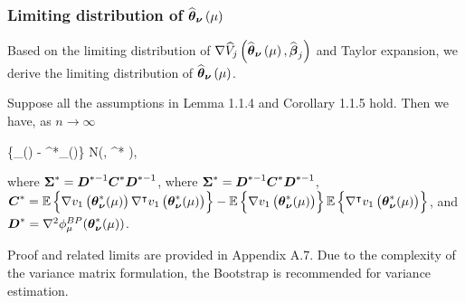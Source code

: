 \subsubsection{Limiting distribution of $\widehat{\boldsymbol{\theta}}_{\boldsymbol{\nu}}\left(\mu\right)$}
Based on the limiting distribution of $\nabla\widehat{V}_j\left(\widehat{\boldsymbol{\theta}}_{\boldsymbol{\nu}}\left(\mu\right)  , \widehat{\boldsymbol{\beta}}_j\right)$ and Taylor expansion, we derive the limiting distribution of $\widehat{\boldsymbol{\theta}}_{\boldsymbol{\nu}}\left(\mu\right)$.
\begin{theorem}
	Suppose all the assumptions in Lemma 1.1.4 and Corollary 1.1.5 hold. Then we have, as $n\to \infty$
	\begin{flalign*}
	\lt\{\widehat{\bs{\theta}}_{\bs{\nu}}(\mu) - \bs{\theta}^*_{\bs{\nu}}(\mu)\rt\}  N\lt(, \bs{\Sigma}^* \rt),
	\end{flalign*}
	where $\boldsymbol{\Sigma}^* = \boldsymbol{D}^{*-1}\boldsymbol{C}^{*}\boldsymbol{D}^{*-1}$, 
	where $\boldsymbol{\Sigma}^* = \boldsymbol{D}^{*-1}\boldsymbol{C}^{*}\boldsymbol{D}^{*-1}$,
	$\boldsymbol{C}^* =\mathbb{E}\left\{  \nabla v_1\left(\boldsymbol{\theta}^*_{\boldsymbol{\nu}}(\mu)\right)\nabla^{\intercal} v_1\left(\boldsymbol{\theta}^*_{\boldsymbol{\nu}}(\mu)\right) \right\} - \mathbb{E}\left\{\nabla v_1\left(\boldsymbol{\theta}^*_{\boldsymbol{\nu}}(\mu)\right)\right\} \mathbb{E}\left\{\nabla^{\intercal} v_1\left(\boldsymbol{\theta}^*_{\boldsymbol{\nu}}(\mu)\right)\right\}$,  and $\boldsymbol{D}^*  =  \nabla^2 \phi_{\mu}^{BP}(\boldsymbol{\theta}^*_{\boldsymbol{\nu}}(\mu))$.
\end{theorem}
Proof and related limits are provided in Appendix A.7.  Due to the complexity of the variance matrix formulation, the Bootstrap is recommended for variance estimation.
